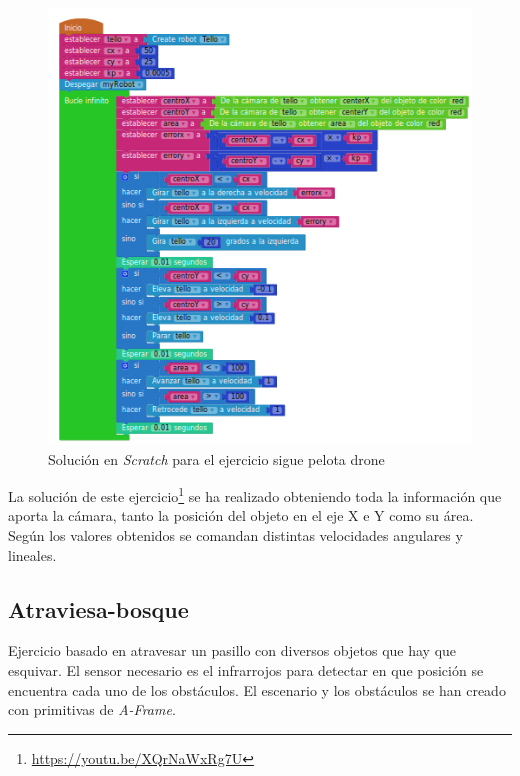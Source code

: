     \begin{figure}[H]
    \centering
    \includegraphics[scale=0.5]{img/siguepelotacodigo.png}
    \caption{Solución en \textit{Scratch} para el ejercicio sigue pelota drone} 
    \label{fig:pelotaSolution}
    \end{figure}
    La solución de este ejercicio\footnote{\url{https://youtu.be/XQrNaWxRg7U}} se ha realizado obteniendo toda la información que aporta la cámara, tanto la posición del objeto en el eje X e Y como su área. Según los valores obtenidos se comandan distintas velocidades angulares y lineales. 
\subsection{Atraviesa-bosque}
\label{subsec:atraviesabosque}
Ejercicio basado en atravesar un pasillo con diversos objetos que hay que esquivar. El sensor necesario es el infrarrojos para detectar en que posición se encuentra cada uno de los obstáculos. El escenario y los obstáculos se han creado con primitivas de \textit{A-Frame}.

